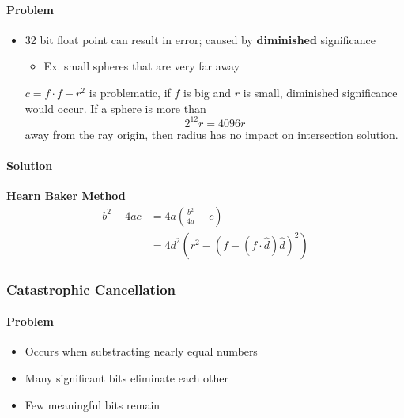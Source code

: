       \paragraph{Problem}
      \begin{itemize}
        \item 32 bit float point can result in error; caused by
        \textbf{diminished} significance
        \begin{itemize}
          \item Ex. small spheres that are very far away
        \end{itemize}

        $ c = f \cdot f - r^{2}  $ is problematic, if $ f $ is big and $ r $ is
        small, diminished significance would occur. If a sphere is more than
        \begin{equation}
          2^{12} r = 4096 r
        \end{equation}
        away from the ray origin, then radius has no impact on intersection
        solution.
      \end{itemize}

      \paragraph{Solution} \textbf{Hearn Baker Method}
      \begin{align}
        b^{2} - 4ac &= 4a \left( \frac{b^{2}}{4a} - c \right) \\
        &= 4d^{2} \left( r^{2} - \left( f - \left( f \cdot \hat{d} \right) \hat{d} \right)^{2} \right)
      \end{align}

    \subsubsection{Catastrophic Cancellation}

      \paragraph{Problem}
      \begin{itemize}
        \item Occurs when substracting nearly equal numbers
        \item Many significant bits eliminate each other
        \item Few meaningful bits remain
      \end{itemize}

